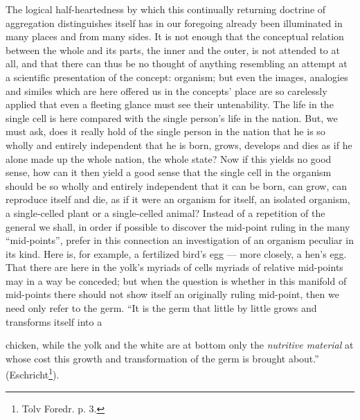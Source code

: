 \documentclass[12pt,a4paper]{book}
\begin{document}
The logical half-heartedness by which this continually returning doctrine of
aggregation distinguishes itself has in our foregoing already been illuminated in
many places and from many sides. It is not enough that the conceptual relation
between the whole and its parts, the inner and the outer, is not attended to at
all, and that there can thus be no thought of anything resembling an attempt at a
scientific presentation of the concept: organism; but even the images, analogies
and similes which are here offered us in the concepts' place are so carelessly
applied that even a fleeting glance must see their untenability. The life in the
single cell is here compared with the single person's life in the nation. But, we
must ask, does it really hold of the single person in the nation that he is so
wholly and entirely independent that he is born, grows, develops and dies as if he
alone made up the whole nation, the whole state? Now if this yields no good sense,
how can it then yield a good sense that the single cell in the organism should be so
wholly and entirely independent that it can be born, can grow, can reproduce itself
and die, as if it were an organism for itself, an isolated organism, a single-celled
plant or a single-celled animal? Instead of a repetition of the general we shall,
in order if possible to discover the mid-point ruling in the many ``mid-points'',
prefer in this connection an investigation of an organism peculiar in its kind. Here
is, for example, a fertilized bird's egg --- more closely, a hen's egg. That there
are here in the yolk's myriads of cells myriads of relative mid-points may in a way
be conceded; but when the question is whether in this manifold of mid-points there
should not show itself an originally ruling mid-point, then we need only refer to
the germ. ``It is the germ that little by little grows and transforms itself into a

\setcounter{footnote}{0}
chicken, while the yolk and the white are at bottom only the \emph{nutritive
material} at whose cost this growth and transformation of the germ is brought
about.'' (Eschricht\footnote{Tolv Foredr. p. 3.}).
\end{document}
